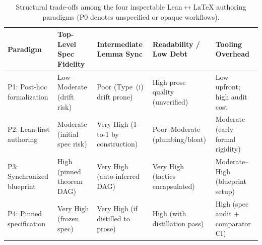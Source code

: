 \documentclass[11pt,letterpaper]{article}
\begin{document}
\begin{table}[!tbp]
\centering
\caption{Structural trade-offs among the four inspectable Lean$\leftrightarrow$\LaTeX{} authoring paradigms (P0 denotes unspecified or opaque workflows).}
\label{tab:paradigms}
\scriptsize
\setlength{\tabcolsep}{3.5pt}
\begin{tabularx}{\textwidth}{@{}>{\raggedright\arraybackslash}p{3.0cm}>{\raggedright\arraybackslash}X>{\raggedright\arraybackslash}X>{\raggedright\arraybackslash}X>{\raggedright\arraybackslash}X@{}}
\toprule
\textbf{Paradigm} & \textbf{Top-Level Spec Fidelity} & \textbf{Intermediate Lemma Sync} & \textbf{Readability / Low Debt} & \textbf{Tooling Overhead} \\
\midrule
P1: Post-hoc formalization & Low--Moderate (drift risk) & Poor (Type~(i) drift prone) & High prose quality (unverified) & Low upfront; high audit cost \\
P2: Lean-first authoring & Moderate (initial spec risk) & Very High (1-to-1 by construction) & Poor--Moderate (plumbing/bloat) & Moderate (early formal rigidity) \\
P3: Synchronized blueprint & High (pinned theorem DAG) & Very High (auto-inferred DAG) & Very High (tactics encapsulated) & Moderate--High (blueprint setup) \\
P4: Pinned specification & Very High (frozen spec) & Very High (if distilled to prose) & High (with distillation pass) & High (spec audit + comparator CI) \\
\bottomrule
\end{tabularx}
\end{table}
\end{document}
